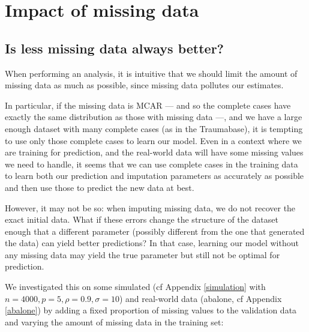 	\section{Impact of missing data}
		\subsection{Is less missing data always better?}
	\label{miss_impact}
When performing an analysis, it is intuitive that we should limit the amount of missing data as much as possible, since missing data pollutes our estimates.

In particular, if the missing data is MCAR --- and so the complete cases have exactly the same distribution as those with missing data ---, and we have a large enough dataset with many complete cases (as in the Traumabase), it is tempting to use only those complete cases to learn our model. Even in a context where we are training for prediction, and the real-world data will have some missing values we need to handle, it seems that we can use complete cases in the training data to learn both our prediction and imputation parameters as accurately as possible and then use those to predict the new data at best.

However, it may not be so: when imputing missing data, we do not recover the exact initial data. What if these errors change the structure of the dataset enough that a different parameter (possibly different from the one that generated the data) can yield better predictions? In that case, learning our model without any missing data may yield the true parameter but still not be optimal for prediction.

We investigated this on some simulated (cf Appendix \ref{simulation} with $n=4000, p=5, \rho=0.9, \sigma=10$) and real-world data (abalone, cf Appendix \ref{abalone}) by adding a fixed proportion of missing values to the validation data and varying the amount of missing data in the training set:

